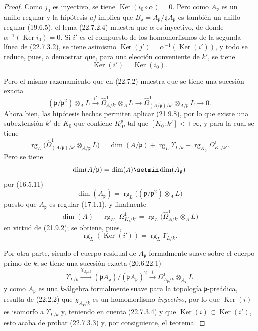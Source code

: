 \begin{proof}
Como $j_0$ es inyectivo, se tiene $\operatorname{Ker}(i_0\circ\alpha)=0$. Pero como
$A_{\mathfrak p}$ es un anillo regular y la hipótesis \emph{a)} implica que
$B_{\mathfrak p}=A_{\mathfrak p}/\mathfrak qA_{\mathfrak p}$ es también un
anillo regular (19.6.5), el lema (22.7.2.4) muestra que $\alpha$ es inyectivo,
de donde $\alpha^{-1}(\operatorname{Ker} i_0)=0$. Si $i'$ es el compuesto de los homomorfismos de la
segunda línea de (22.7.3.2), se tiene asimismo
$\operatorname{Ker}(j')=\alpha^{-1}(\operatorname{Ker}(i'))$, y todo se reduce, pues, a demostrar que, para una
elección conveniente de $k'$, se tiene
\begin{equation}
\label{0.22.7.3.3-fr}
  \operatorname{Ker}(i')=\operatorname{Ker}(i_0).
  \tag{22.7.3.3}
\end{equation}

Pero el mismo razonamiento que en (22.7.2) muestra que se tiene una sucesión exacta
\[
  (\mathfrak p/\mathfrak p^2)\otimes_AL\xrightarrow{i'}
  \widehat\Omega^1_{A/k'}\otimes_AL\longrightarrow
  \widehat\Omega^1_{(A/\mathfrak p)/k'}\otimes_{A/\mathfrak p}L
  \longrightarrow0.
\]
Ahora bien, las hipótesis hechas permiten aplicar (21.9.8), por lo que existe una
subextensión $k'$ de $K_0$ que contiene $K_0^p$, tal que
$[K_0:k']<+\infty$, y para la cual se tiene
\[
  \operatorname{rg}_L\bigl(\widehat\Omega^1_{(A/\mathfrak p)/k'}
  \otimes_{A/\mathfrak p}L\bigr)
  =\dim(A/\mathfrak p)+\operatorname{rg}_L\Upsilon_{L/k}
  +\operatorname{rg}_{K_0}\Omega^1_{K_0/k'}.
\]
Pero se tiene
\[
  \dim(A/\mathfrak p)=\dim(A)\setmin\dim(A_{\mathfrak p})
\]
por (16.5.11)
\[
  \dim(A_{\mathfrak p})
  =\operatorname{rg}_L\bigl((\mathfrak p/\mathfrak p^2)\otimes_AL\bigr)
\]
puesto que $A_{\mathfrak p}$ es regular (17.1.1), y finalmente
\[
  \dim(A)+\operatorname{rg}_{K_0}\Omega^1_{K_0/k'}
  =\operatorname{rg}_L\bigl(\widehat\Omega^1_{A/k'}\otimes_AL\bigr)
\]
en virtud de (21.9.2); se obtiene, pues,
\begin{equation}
\label{0.22.7.3.4-fr}
  \operatorname{rg}_L(\operatorname{Ker}(i'))=\operatorname{rg}_L\Upsilon_{L/k}.
  \tag{22.7.3.4}
\end{equation}

Por otra parte, siendo el cuerpo residual de $A_{\mathfrak p}$ formalmente suave
sobre el cuerpo primo de $k$, se tiene una sucesión exacta (20.6.22.1)
\[
  \Upsilon_{L/k}\xrightarrow{\chi_{A_{\mathfrak p}/k}}
  (\mathfrak pA_{\mathfrak p})/(\mathfrak pA_{\mathfrak p})^2
  \xrightarrow{i}\Omega^1_{A_{\mathfrak p}/k}
  \otimes_{A_{\mathfrak p}}L
\]
y como $A_{\mathfrak p}$ es una $k$-álgebra formalmente suave para la
topología $\mathfrak p$-preádica, resulta de (22.2.2) que
$\chi_{A_{\mathfrak p}/k}$ es un homomorfismo \emph{inyectivo}, por lo que $\operatorname{Ker}(i)$ es
isomorfo a $\Upsilon_{L/k}$ y, teniendo en cuenta (22.7.3.4) y que
$\operatorname{Ker}(i)\subset\operatorname{Ker}(i')$, esto acaba de probar (22.7.3.3) y, por consiguiente, el
teorema.
\end{proof}

